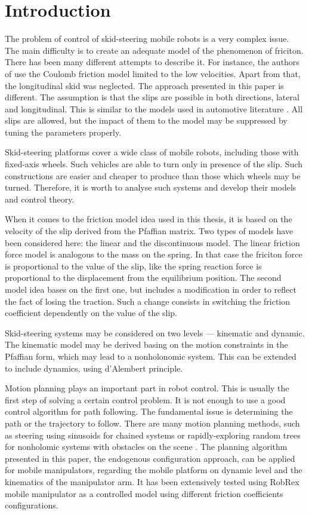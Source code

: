 \chapter{Introduction}
The problem of control of skid-steering mobile robots is a very complex issue. 
The main difficulty is to create an adequate model of the phenomenon of friciton. 
There has been many different attempts to describe it.
For instance, the authors of \cite{caracciolo1999trajectory} use the Coulomb friction model limited to the low velocities.
Apart from that, the longitudinal skid was neglected. The approach presented in this paper is different.
The assumption is that the slips are possible in both directions, lateral and longitudinal.
This is similar to the models used in automotive literature \cite{pacejka2005tyre}.
All slips are allowed, but the impact of them to the model may be suppressed by tuning the
parameters properly. 

Skid-steering platforms cover a wide class of mobile robots, including those with fixed-axis wheels. Such vehicles are able to turn only in presence of the slip. Such constructions are easier and cheaper to produce than those which wheels may be turned. Therefore, it is worth to analyse such systems and develop their models and control theory.

When it comes to the friction model idea used in this thesis,
it is based on the velocity of the slip derived
from the Pfaffian matrix. %
Two types of models have been considered here: the linear and the discontinuous model.
The linear friction force model is analogous to the mass on the spring. In that case the friciton
force is proportional to the value of the slip, like the spring reaction force is proportional
to the displacement from the equilibrium position. The second model idea bases on the first one,
but includes a modification in order to reflect the fact of losing the traction. Such a change
consists in switching the friction coefficient dependently on the value of the slip.

Skid-steering systems may be considered on two levels --- kinematic and dynamic.
The kinematic model may be derived basing on the motion constraints in the Pfaffian form, which may lead
to a nonholonomic system. This can be extended to include dynamics, using d'Alembert principle.

Motion planning plays an important part in robot control. This is usually the first step of solving
a certain control problem. It is not enough to use a good control algorithm for path following. The fundamental
issue is determining the path or the trajectory to follow. There are many motion planning methods,
such as steering using sinusoids for chained systems \cite{murray1993nonholonomic} or rapidly-exploring random trees for nonholomic systems
with obstacles on the scene \cite{lavalle2000rapidly}. The planning algorithm presented in this paper,
the endogenous configuration approach, can be applied for mobile manipulators, regarding the
mobile platform on dynamic level and the kinematics of the manipulator arm. It has been extensively
tested using RobRex mobile manipulator as a controlled model using different
friction coefficients configurations.

